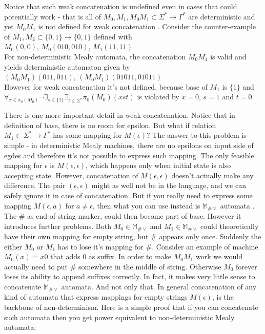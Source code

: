 \documentclass[12pt]{article}
\begin{document}
Notice that such weak concatenation is undefined even in cases that could potentially work - that is all of $M_0,M_1,M_0M_1 \subset \Sigma^* \rightarrow \Gamma^*$ are deterministic and yet $M_0M_1$ is not defined for weak concatenation . Consider the counter-example of $M_1,M_2 \subset \{0,1\}\rightarrow\{0,1\}$ defined with \\
$M_0(0,0)$,  $M_0(010,010)$, $M_1(11,11)$ \\
For non-deterministic Mealy automata, the concatenation $M_0M_1$ is valid and yields deterministic automaton given by \\
$(M_0M_1)(011,011)$,  $(M_0M_1)(01011,01011)$ \\
However for weak concatenation it's not defined, because base of $M_1$ is $\{1\}$ and  $\forall_{x\in \pi_0(M_0)} \neg \exists_{s\in\{1\}} \exists_{t\in\Sigma^*} \pi_0(M_0)(xst)$ is violated by $x=0$, $s=1$ and $t=0$.


There is one more important detail in weak concatenation. Notice that in definition of base, there is no room for epsilon. But what if relation $M_1 \subset \Sigma^* \rightarrow \Gamma^*$ has some mapping for $M(\epsilon)$? The answer to this problem is simple - in deterministic Mealy machines, there are no epsilons on input side of egdes and therefore it's not possible to express such mapping. The only feasible mapping for $\epsilon$ is $M(\epsilon,\epsilon)$, which happens only when initial state is also accepting state. However, concatenation of $M(\epsilon,\epsilon)$ doesn't actually make any difference. The pair $(\epsilon,\epsilon)$ might as well not be in the language, and we can safely ignore it in case of concatenation.  But if you really need to express some mapping $M(\epsilon,a)$ for $a\ne\epsilon$, then what you can use instead is $\mathbb{M}_{\#\vee}$ automata . The $\#$ as end-of-string marker,  could then become part of base. However it introduces further problems. Both $M_0 \in \mathbb{M}_{\#\vee}$ and $M_1 \in \mathbb{M}_{\#\vee}$ could theoretically have their own mapping for empty string, but $\#$ appears only once. Suddenly the either $M_0$ or $M_1$ has to lose it's mapping for $\#$. Consider an example of machine $M_0(x)=x0$ that adds 0 as suffix. In order to make $M_0M_1$ work we would actually need to put $\#$ somewhere in the middle of string. Otherwise $M_0$ forever loses its ability to append suffixes correctly. In fact, it makes very little sense to concatenate $\mathbb{M}_{\#\vee}$ automata. And not only that. In general concatenation of any kind of automata that express mappings for empty strings $M(\epsilon)$, is the backbone of non-determinism. Here is a simple proof that if you can concatenate such automata then you get power equivalent to non-deterministic Mealy automata:
\end{document}
